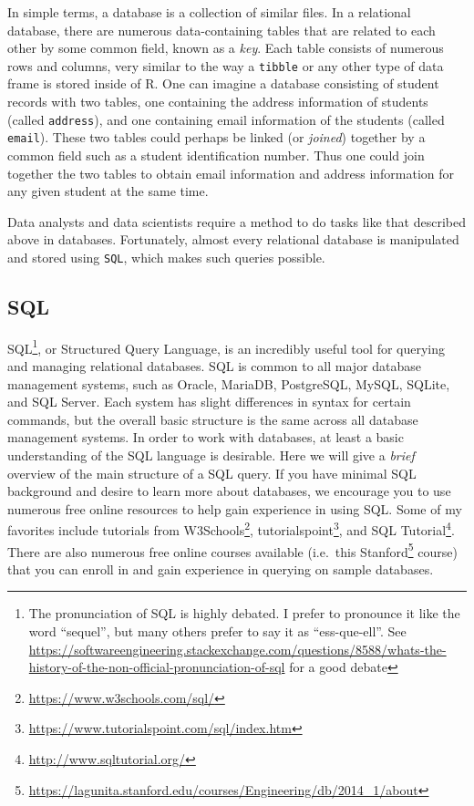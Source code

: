 \documentclass[
]{krantz}
\renewcommand{\href}[2]{#2\footnote{\url{#1}}}
\begin{document}
In simple terms, a database is a collection of similar files. In a relational database, there are numerous data-containing tables that are related to each other by some common field, known as a \emph{key}. Each table consists of numerous rows and columns, very similar to the way a \texttt{tibble} or any other type of data frame is stored inside of R. One can imagine a database consisting of student records with two tables, one containing the address information of students (called \texttt{address}), and one containing email information of the students (called \texttt{email}). These two tables could perhaps be linked (or \emph{joined}) together by a common field such as a student identification number. Thus one could join together the two tables to obtain email information and address information for any given student at the same time.

Data analysts and data scientists require a method to do tasks like that described above in databases. Fortunately, almost every relational database is manipulated and stored using \texttt{SQL}, which makes such queries possible.

\hypertarget{sql}{%
\subsection{SQL}\label{sql}}

SQL\footnote{The pronunciation of SQL is highly debated. I prefer to pronounce it like the word ``sequel'', but many others prefer to say it as ``ess-que-ell''. See \url{https://softwareengineering.stackexchange.com/questions/8588/whats-the-history-of-the-non-official-pronunciation-of-sql} for a good debate}, or Structured Query Language, is an incredibly useful tool for querying and managing relational databases. SQL is common to all major database management systems, such as Oracle, MariaDB, PostgreSQL, MySQL, SQLite, and SQL Server. Each system has slight differences in syntax for certain commands, but the overall basic structure is the same across all database management systems. In order to work with databases, at least a basic understanding of the SQL language is desirable. Here we will give a \emph{brief} overview of the main structure of a SQL query. If you have minimal SQL background and desire to learn more about databases, we encourage you to use numerous free online resources to help gain experience in using SQL. Some of my favorites include tutorials from \href{https://www.w3schools.com/sql/}{W3Schools}, \href{https://www.tutorialspoint.com/sql/index.htm}{tutorialspoint}, and \href{http://www.sqltutorial.org/}{SQL Tutorial}. There are also numerous free online courses available (i.e.~this \href{https://lagunita.stanford.edu/courses/Engineering/db/2014_1/about}{Stanford} course) that you can enroll in and gain experience in querying on sample databases.
\end{document}
